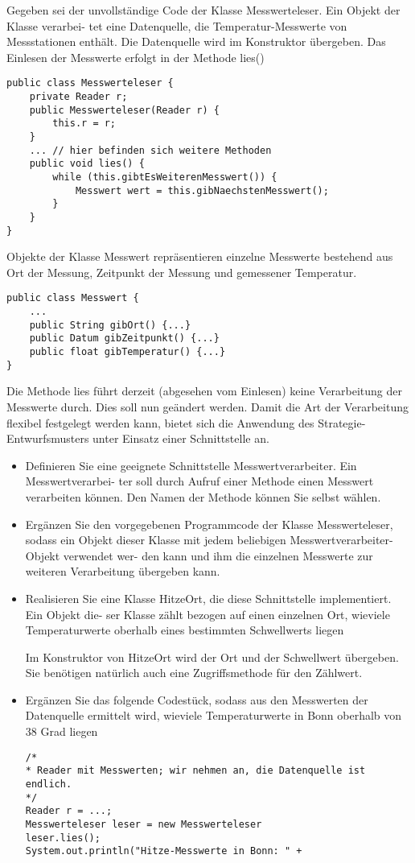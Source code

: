 {Gegeben sei der unvollständige Code der Klasse Messwerteleser. Ein Objekt der
Klasse verarbei- tet eine Datenquelle, die Temperatur-Messwerte von
Messstationen enthält. Die Datenquelle wird im Konstruktor übergeben. Das
Einlesen der Messwerte erfolgt in der Methode lies()

\begin{lstlisting}
public class Messwerteleser {
    private Reader r;
    public Messwerteleser(Reader r) {
        this.r = r;
    }
    ... // hier befinden sich weitere Methoden
    public void lies() {
        while (this.gibtEsWeiterenMesswert()) {
            Messwert wert = this.gibNaechstenMesswert();
        }
    }
}
\end{lstlisting}

Objekte der Klasse Messwert repräsentieren einzelne Messwerte bestehend aus Ort
der Messung, Zeitpunkt der Messung und gemessener Temperatur.

\begin{lstlisting}
public class Messwert {
    ...
    public String gibOrt() {...}
    public Datum gibZeitpunkt() {...}
    public float gibTemperatur() {...}
}
\end{lstlisting}

Die Methode lies führt derzeit (abgesehen vom Einlesen) keine Verarbeitung der
Messwerte durch. Dies soll nun geändert werden. Damit die Art der Verarbeitung
flexibel festgelegt werden kann, bietet sich die Anwendung des
Strategie-Entwurfsmusters unter Einsatz einer Schnittstelle an.

\begin{itemize}
    \item Definieren Sie eine geeignete Schnittstelle Messwertverarbeiter. Ein
          Messwertverarbei- ter soll durch Aufruf einer Methode einen Messwert
          verarbeiten können. Den Namen der Methode können Sie selbst wählen.
    \item Ergänzen Sie den vorgegebenen Programmcode der Klasse Messwerteleser, sodass
          ein Objekt dieser Klasse mit jedem beliebigen Messwertverarbeiter-Objekt
          verwendet wer- den kann und ihm die einzelnen Messwerte zur weiteren
          Verarbeitung übergeben kann.
    \item Realisieren Sie eine Klasse HitzeOrt, die diese Schnittstelle implementiert.
          Ein Objekt die- ser Klasse zählt bezogen auf einen einzelnen Ort, wieviele
          Temperaturwerte oberhalb eines bestimmten Schwellwerts liegen

          Im Konstruktor von HitzeOrt wird der Ort und der Schwellwert übergeben. Sie
          benötigen natürlich auch eine Zugriffsmethode für den Zählwert.
    \item Ergänzen Sie das folgende Codestück, sodass aus den Messwerten der Datenquelle
          ermittelt wird, wieviele Temperaturwerte in Bonn oberhalb von 38 Grad liegen
          \begin{lstlisting}
/*
* Reader mit Messwerten; wir nehmen an, die Datenquelle ist endlich.
*/
Reader r = ...;
Messwerteleser leser = new Messwerteleser
leser.lies();
System.out.println("Hitze-Messwerte in Bonn: " +
\end{lstlisting}
\end{itemize}

}
